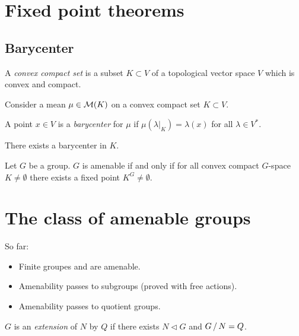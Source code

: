     \section{Fixed point theorems}

    \subsection{Barycenter}
    \begin{definition}
        A \emph{convex compact set} is a subset $K \subset V$
        of a topological vector space $V$ which is convex and compact.
    \end{definition}

    \begin{definition}
        Consider a mean $\mu \in \mathcal{M}(K)$ on a convex compact set $K \subset V$.

        A point $x \in V$ is a \emph{barycenter} for $\mu$ 
        if $\mu(\lambda|_K) = \lambda(x)$ for all $\lambda \in V^*$.
    \end{definition}

    \begin{theorem}
        There exists a barycenter in $K$.
    \end{theorem}

    \begin{theorem}
        Let $G$ be a group.
        $G$ is amenable if and only if 
        for all convex compact $G$-space $K \neq \emptyset$
        there exists a fixed point $K^G \neq \emptyset$.
    \end{theorem}

    \section{The class of amenable groups}

    So far:
    \begin{itemize}
        \item Finite groupes and \Z are amenable.
        \item Amenability passes to subgroups (proved with free actions).
        \item Amenability passes to quotient groups.
    \end{itemize}

    \begin{definition}
        $G$ is an \emph{extension} of $N$ by $Q$
        if there exists $N \lhd G$ and $\quotient{G}{N} = Q$.
    \end{definition}

